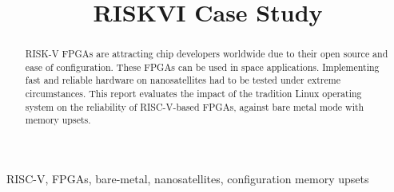 \documentclass[conference]{IEEEtran}
\begin{document}
\title{RISKVI Case Study\\}
\author{
}
\maketitle

\begin{abstract}
RISK-V FPGAs are attracting chip developers worldwide due to their open source and 
ease of configuration. These FPGAs can be used in space applications. Implementing fast and reliable 
hardware on nanosatellites had to be tested under extreme circumstances. This report evaluates the
impact of the tradition Linux operating system on the reliability of RISC-V-based FPGAs, against bare metal mode 
with memory upsets. 
\end{abstract}
\begin{IEEEkeywords}
RISC-V, FPGAs, bare-metal, nanosatellites, configuration memory upsets
\end{IEEEkeywords}

\end{document}
